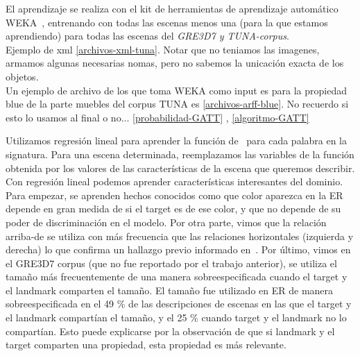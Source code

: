 
El aprendizaje se realiza con el kit de herramientas de aprendizaje autom\'atico
WEKA~\cite{Hall:WEK09}, entrenando con todas las escenas menos una (para la que estamos aprendiendo) para todas las escenas del \textit{GRE3D7 y TUNA-corpus}. \\
Ejemplo de xml \ref{archivos-xml-tuna}. Notar que no teniamos las imagenes, armamos algunas necesarias nomas, pero no sabemos la unicaci\'on exacta de los objetos.\\

Un ejemplo de archivo de los que toma WEKA como input es para la propiedad blue de la parte muebles del corpus TUNA es \ref{archivos-arff-blue}. 
No recuerdo si esto lo usamos al final o no...
\ref{probabilidad-GATT} , \ref{algoritmo-GATT} 

Utilizamos regresi\'on lineal para aprender la funci\'on de
\puse\ para cada palabra en la signatura. Para una escena determinada, reemplazamos
las variables de la funci\'on obtenida por los valores de las caracter\'{i}sticas
de la escena que queremos describir.\\

Con regresi\'on lineal podemos aprender caracter\'{i}sticas interesantes
 del dominio. Para empezar, se aprenden hechos conocidos
como que color aparezca en la ER depende en gran medida de si el
target es de ese color, y que no depende de su
poder de discriminaci\'on en el modelo. Por otra parte, vimos que la relaci\'on arriba-de
 se utiliza con m\'as frecuencia que las relaciones horizontales
(izquierda y derecha) lo que confirma un hallazgo previo informado
en~\cite{viet:gene11}. Por \'ultimo, vimos en el
GRE3D7 corpus (que no fue reportado por el trabajo anterior), se utiliza el tama\~no
m\'as frecuentemente de una manera sobreespecificada cuando el
target y el landmark comparten el tama\~no. El tama\~no fue utilizado en ER de manera sobreespecificada en el 49 \% de
las descripciones de escenas en las que el target y el landmark compart\'ian el tama\~no,
y el 25 \% cuando target y el landmark no lo compart\'ian. Esto puede explicarse por la observaci\'on de que si landmark y el target comparten una propiedad, esta propiedad es m\'as relevante.



